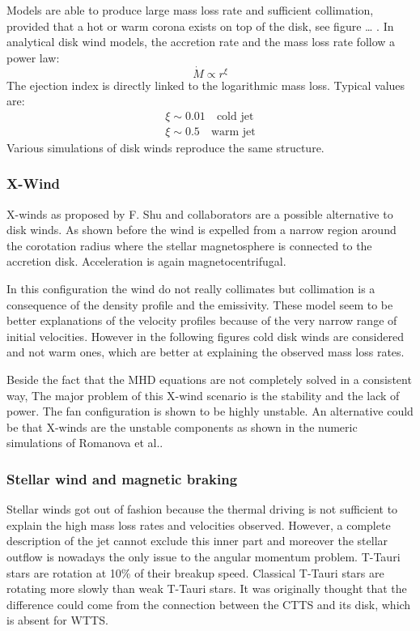 \documentclass[10pt,a4paper,english]{article}
\begin{document}
Models are able to produce large mass loss rate and sufficient collimation, provided that a hot or warm corona exists on top of the disk, see figure … . In analytical disk wind models, the accretion rate and the mass loss rate follow a power law:
\begin{equation}
    \dot{M} \propto r^\xi
\end{equation}
The ejection index is directly linked to the logarithmic mass loss. Typical values are:
\begin{align}
    \xi \sim 0.01 \quad \textrm{cold jet} \\
    \xi \sim 0.5 \quad \textrm{warm jet}
\end{align}
Various simulations of disk winds reproduce the same structure.
\subsubsection{X-Wind}
X-winds as proposed by F. Shu and collaborators are a possible alternative to disk winds. As shown before the wind is expelled from a narrow region around the corotation radius where the stellar magnetosphere is connected to the accretion disk. Acceleration is again magnetocentrifugal.

In this configuration the wind do not really collimates but collimation is a consequence of the density profile and the emissivity.
These model seem to be better explanations of the velocity profiles because of the very narrow range of initial velocities. However in the following figures  cold disk winds are considered and not warm ones, which are better at explaining the observed mass loss rates.

Beside the fact that the MHD equations are not completely solved in a consistent way, The major problem of this X-wind scenario is the stability and the lack of power. The fan  configuration is shown to be highly unstable. An alternative could be that X-winds are the unstable components as shown in the numeric simulations of Romanova et al..
\subsubsection{Stellar wind and magnetic braking}
Stellar winds got out of fashion because the thermal driving is not sufficient to explain the high mass loss rates and velocities observed. However, a complete description of the jet cannot exclude this inner part and moreover the stellar outflow is nowadays the only issue to the angular momentum problem.
T-Tauri stars are rotation at 10\% of their breakup speed. Classical T-Tauri stars are rotating more slowly than weak T-Tauri stars. It was originally thought that the difference could come from the connection between the CTTS and its disk, which is absent for WTTS.
\end{document}
